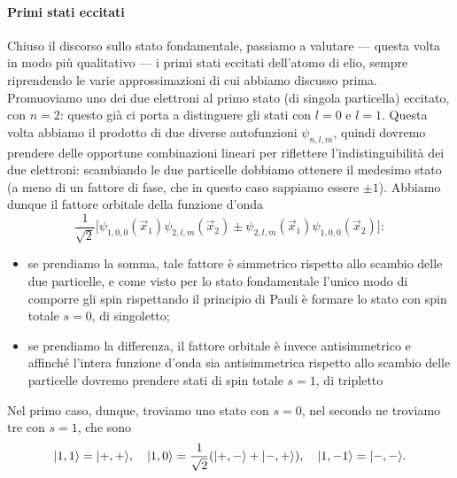 \paragraph{Primi stati eccitati}
Chiuso il discorso sullo stato fondamentale, passiamo a valutare --- questa volta in modo più qualitativo --- i primi stati eccitati dell'atomo di elio, sempre riprendendo le varie approssimazioni di cui abbiamo discusso prima.
Promuoviamo uno dei due elettroni al primo stato (di singola particella) eccitato, con $n=2$: questo già ci porta a distinguere gli stati con $l=0$ e $l=1$.
Questa volta abbiamo il prodotto di due diverse autofunzioni $\psi_{n,l,m}$, quindi dovremo prendere delle opportune combinazioni lineari per riflettere l'indistinguibilità dei due elettroni: scambiando le due particelle dobbiamo ottenere il medesimo stato (a meno di un fattore di fase, che in questo caso sappiamo essere $\pm 1$).
Abbiamo dunque il fattore orbitale della funzione d'onda
\begin{equation}
    \frac1{\sqrt{2}}\bigl[\psi_{1,0,0}(\vec x_1)\psi_{2,l,m}(\vec x_2)\pm\psi_{2,l,m}(\vec x_1)\psi_{1,0,0}(\vec x_2)\bigr]:
\end{equation}
\begin{itemize}
    \item se prendiamo la somma, tale fattore è simmetrico rispetto allo scambio delle due particelle, e come visto per lo stato fondamentale l'unico modo di comporre gli spin rispettando il principio di Pauli è formare lo stato con spin totale $s=0$, di singoletto;
    \item se prendiamo la differenza, il fattore orbitale è invece antisimmetrico e affinch\'e l'intera funzione d'onda sia antisimmetrica rispetto allo scambio delle particelle dovremo prendere stati di spin totale $s=1$, di tripletto
\end{itemize}
Nel primo caso, dunque, troviamo uno stato con $s=0$, nel secondo ne troviamo tre con $s=1$, che sono
\begin{equation}
    \lvert1,1\rangle=\lvert+,+\rangle,\quad
    \lvert1,0\rangle=\frac1{\sqrt{2}}(\lvert+,-\rangle+\lvert-,+\rangle),\quad
    \lvert1,-1\rangle=\lvert-,-\rangle.
\end{equation}


